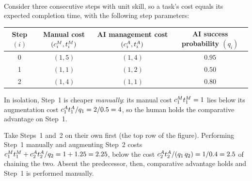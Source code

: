 \documentclass[12pt, final]{article}
\begin{document}
\pagestyle{plain}

\\[-0.2em]
\noindent{\color{black!25}\rule{\linewidth}{0.4pt}}\par\vspace{1em}
\renewcommand\theexample{\arabic{example}}
\setcounter{example}{0}
\begin{example}
\label{ex:ca_predecessor}
Consider three consecutive steps with unit skill, so a task's cost equals its expected completion time, with the following step parameters:
\begin{center}
\begin{tabular}{c|ccc}
\toprule
\makecell{Step\\$(i)$} & \makecell{Manual cost\\$(c^{M}_{i}, t^{M}_{i})$} & \makecell{AI management cost\\$(c^{A}_{i}, t^{A}_{i})$} & \makecell{AI success probability\\$(q_i)$} \\
\midrule
0 & $(1, 5)$ & $(1, 4)$ & $0.95$ \\
1 & $(1, 1)$ & $(1, 2)$ & $0.50$ \\
2 & $(1, 4)$ & $(1, 1)$ & $0.80$ \\
\bottomrule
\end{tabular}
\end{center}

In isolation, Step~1 is cheaper \emph{manually}: its manual cost $c^{M}_{1}t^{M}_{1} = 1$ lies below its augmentation cost $c^{A}_{1}t^{A}_{1}/q_1 = 2/0.5 = 4$, so the human holds the comparative advantage on Step~1.

Take Steps~1 and~2 on their own first (the top row of the figure).
Performing Step~1 manually and augmenting Step~2 costs $c^{M}_{1}t^{M}_{1} + c^{A}_{2}t^{A}_{2}/q_2 = 1 + 1.25 = 2.25$, below the cost $c^{A}_{2}t^{A}_{2}/(q_1\, q_2) = 1/0.4 = 2.5$ of chaining the two.
Absent the predecessor, then, comparative advantage holds and Step~1 is performed manually.


\end{example}
\end{document}
